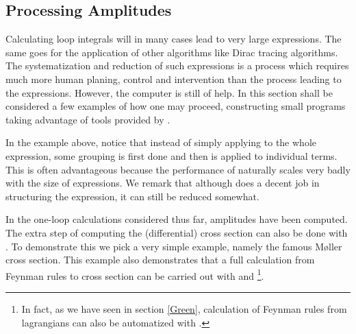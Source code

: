 \subsection{Processing Amplitudes}
\label{process}

Calculating loop integrals will in many cases lead to very large expressions. The same goes for the application of other algorithms like Dirac tracing algorithms. The systematization and reduction of such expressions is a process which requires much more human planing, control and intervention than the process leading to the expressions. However, the computer is still of help. In this section shall be considered a few examples of how one may proceed, constructing small \mma programs taking advantage of tools provided by \fc.

\beom
{}
\enom

In the example above, notice that instead of simply applying  to the whole expression, some grouping is first done and then  is applied to individual terms. This is often advantageous because the performance of  naturally scales very badly with the size of expressions. We remark that although  does a decent job in structuring the expression, it can still be reduced somewhat.

In the one-loop calculations considered thus far, amplitudes have been computed. The extra step of computing the (differential) cross section can also be done with \fc. To demonstrate this we pick a very simple example, namely the famous M{\o}ller cross section. This example also demonstrates that a full calculation from Feynman rules to cross section can be carried out with \fa and \fc \footnote{In fact, as we have seen in section \ref{Green}, calculation of Feynman rules from  lagrangians can also be automatized with \fc.}.

